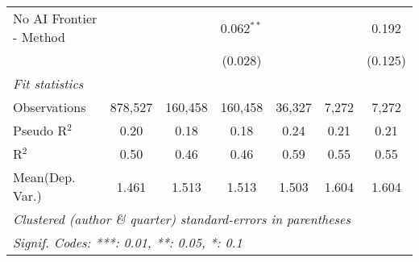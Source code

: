 \begin{tabular}{lcccccc}
   No AI Frontier - Method &              &               & 0.062$^{**}$  &         &             & 0.192\\   
                           &              &               & (0.028)       &         &             & (0.125)\\   
   \midrule
   \emph{Fit statistics}\\
   Observations            & 878,527      & 160,458       & 160,458       & 36,327  & 7,272       & 7,272\\  
   Pseudo R$^2$            & 0.20         & 0.18          & 0.18          & 0.24    & 0.21        & 0.21\\  
   R$^2$                   & 0.50         & 0.46          & 0.46          & 0.59    & 0.55        & 0.55\\  
Mean(Dep. Var.) & 1.461 & 1.513 & 1.513 & 1.503 & 1.604 & 1.604 \\
   \midrule \midrule
   \multicolumn{7}{l}{\emph{Clustered (author \& quarter) standard-errors in parentheses}}\\
   \multicolumn{7}{l}{\emph{Signif. Codes: ***: 0.01, **: 0.05, *: 0.1}}\\
\end{tabular}
\par\endgroup

